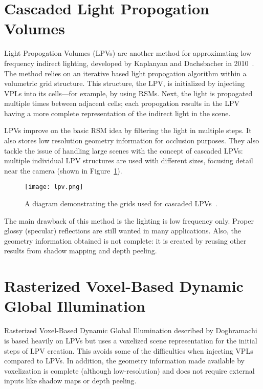 \section{Cascaded Light Propogation Volumes}
Light Propogation Volumes (LPVs) are another method for approximating low frequency indirect lighting, developed by Kaplanyan and Dachsbacher in 2010~\cite{Kaplanyan:2010:CLP:1730804.1730821}. The method relies on an iterative based light propogation algorithm within a volumetric grid structure. This structure, the LPV, is initialized by injecting VPLs into its cells---for example, by using RSMs. Next, the light is propogated multiple times between adjacent cells; each propogation results in the LPV having a more complete representation of the indirect light in the scene.

LPVs improve on the basic RSM idea by filtering the light in multiple steps. It also stores low resolution geometry information for occlusion purposes. They also tackle the issue of handling large scenes with the concept of cascaded LPVs: multiple individual LPV structures are used with different sizes, focusing detail near the camera (shown in Figure~\ref{fig:lpv}).

\begin{figure}[h]
    \centering
    \texttt{[image: lpv.png]}
    \caption{A diagram demonstrating the grids used for cascaded LPVs~\cite{Kaplanyan:2010:CLP:1730804.1730821}.}
    \label{fig:lpv}
\end{figure}

The main drawback of this method is the lighting is low frequency only. Proper glossy (specular) reflections are still wanted in many applications. Also, the geometry information obtained is not complete: it is created by reusing other results from shadow mapping and depth peeling.

\section{Rasterized Voxel-Based Dynamic Global Illumination}
Rasterized Voxel-Based Dynamic Global Illumination described by Doghramachi~\cite{doghramachi2013rasterized} is based heavily on LPVs but uses a voxelized scene representation for the initial steps of LPV creation. This avoids some of the difficulties when injecting VPLs compared to LPVs. In addition, the geometry information made available by voxelization is complete (although low-resolution) and does not require external inputs like shadow maps or depth peeling.


